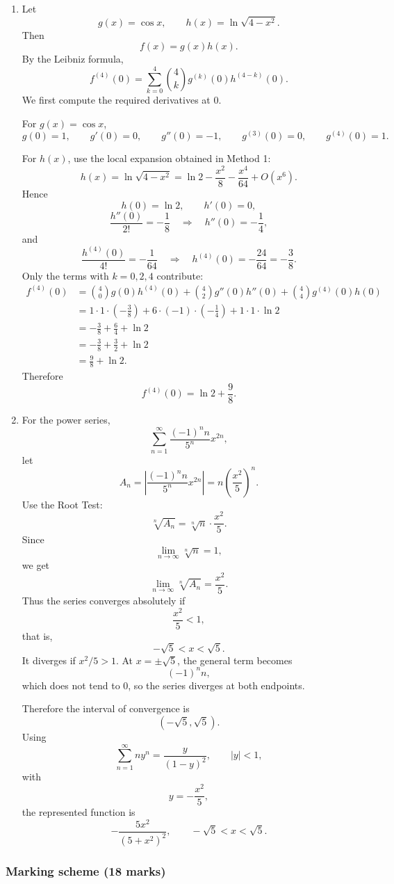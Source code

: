 \documentclass[12pt]{article}
\begin{document}
\begin{enumerate}[label=(\alph*)]
\item Let
\[
g(x)=\cos x,
\qquad
h(x)=\ln\sqrt{4-x^2}.
\]
Then
\[
f(x)=g(x)h(x).
\]
By the Leibniz formula,
\[
f^{(4)}(0)
=
\sum_{k=0}^{4}\binom4k g^{(k)}(0)h^{(4-k)}(0).
\]
We first compute the required derivatives at $0$.

For $g(x)=\cos x$,
\[
g(0)=1,\qquad g'(0)=0,\qquad g''(0)=-1,\qquad g^{(3)}(0)=0,\qquad g^{(4)}(0)=1.
\]

For $h(x)$, use the local expansion obtained in Method 1:
\[
h(x)=\ln\sqrt{4-x^2}
=
\ln2-\frac{x^2}{8}-\frac{x^4}{64}+O(x^6).
\]
Hence
\[
h(0)=\ln2,\qquad h'(0)=0,
\]
\[
\frac{h''(0)}{2!}=-\frac18
\quad\Longrightarrow\quad
h''(0)=-\frac14,
\]
and
\[
\frac{h^{(4)}(0)}{4!}=-\frac1{64}
\quad\Longrightarrow\quad
h^{(4)}(0)=-\frac{24}{64}=-\frac38.
\]
Only the terms with $k=0,2,4$ contribute:
\begin{align*}
f^{(4)}(0)
&=
\binom40 g(0)h^{(4)}(0)
+
\binom42 g''(0)h''(0)
+
\binom44 g^{(4)}(0)h(0)\\
&=
1\cdot1\cdot\left(-\frac38\right)
+
6\cdot(-1)\cdot\left(-\frac14\right)
+
1\cdot1\cdot\ln2\\
&=
-\frac38+\frac64+\ln2\\
&=
-\frac38+\frac32+\ln2\\
&=
\frac98+\ln2.
\end{align*}
Therefore
\[
\boxed{f^{(4)}(0)=\ln2+\frac98.}
\]

\item For the power series,
\[
\sum_{n=1}^{\infty}\frac{(-1)^n n}{5^n}x^{2n},
\]
let
\[
A_n=\left|\frac{(-1)^n n}{5^n}x^{2n}\right|
=
n\left(\frac{x^2}{5}\right)^n.
\]
Use the Root Test:
\[
\sqrt[n]{A_n}
=
\sqrt[n]{n}\cdot \frac{x^2}{5}.
\]
Since
\[
\lim_{n\to\infty}\sqrt[n]{n}=1,
\]
we get
\[
\lim_{n\to\infty}\sqrt[n]{A_n}
=
\frac{x^2}{5}.
\]
Thus the series converges absolutely if
\[
\frac{x^2}{5}<1,
\]
that is,
\[
-\sqrt5<x<\sqrt5.
\]
It diverges if $x^2/5>1$. At $x=\pm\sqrt5$, the general term becomes
\[
(-1)^n n,
\]
which does not tend to $0$, so the series diverges at both endpoints.

Therefore the interval of convergence is
\[
\boxed{(-\sqrt5,\sqrt5).}
\]
Using
\[
\sum_{n=1}^{\infty}ny^n=\frac{y}{(1-y)^2},
\qquad |y|<1,
\]
with
\[
y=-\frac{x^2}{5},
\]
the represented function is
\[
\boxed{
-\frac{5x^2}{(5+x^2)^2},
\qquad -\sqrt5<x<\sqrt5.}
\]
\end{enumerate}

\subsubsection{Marking scheme (18 marks)}
\end{document}
